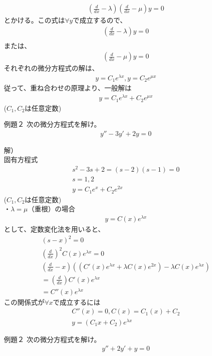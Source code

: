 \documentclass{jsarticle}
\begin{document}
\begin{eqnarray}
\left(\frac{d}{dx}-\lambda \right)\left(\frac{d}{dx}-\mu \right)y=0
\end{eqnarray}
とかける。この式は$\forall y$で成立するので、
\begin{eqnarray}
\left(\frac{d}{dx}-\lambda\right)y=0\\
\end{eqnarray}
または、
\begin{eqnarray}
\left(\frac{d}{dx}-\mu\right)y=0
\end{eqnarray}
それぞれの微分方程式の解は、
\begin{eqnarray}
y=C_1e^{\lambda x},y=C_2e^{\mu x}
\end{eqnarray}
従って、重ね合わせの原理より、一般解は
\begin{eqnarray}
y=C_1e^{\lambda x}+C_2e^{\mu x}
\end{eqnarray}
($C_1,C_2$は任意定数)
\begin{itembox}[l]{例題２}
次の微分方程式を解け。
\begin{eqnarray}
y''-3y'+2y=0
\end{eqnarray}
\end{itembox}
解）\\
固有方程式
\begin{eqnarray}
s^2-3s+2=(s-2)(s-1)=0\\
s=1,2\\
y=C_1e^x+C_2e^{2x}
\end{eqnarray}
($C_1,C_2$は任意定数)\\
・$\lambda = \mu$（重根）の場合\\
\begin{eqnarray}
y=C(x)e^{\lambda x}
\end{eqnarray}
として、定数変化法を用いると、
\begin{eqnarray}
(s-x)^2=0\\
\left(\frac{d}{dx}\right)^2C(x)e^{\lambda x}=0\\
\left(\frac{d}{dx}-x\right)\left(\left(C'(x)e^{\lambda x}+\lambda C(x)e^{2x}\right)-\lambda C(x)e^{\lambda x}\right)\\
=\left(\frac{d}{dx}\right)C'(x)e^{\lambda x}\\
=C''(x)e^{\lambda x}
\end{eqnarray}
この関係式が$\forall x$で成立するには
\begin{eqnarray}
C''(x)=0,C(x)=C_1(x)+C_2\\
y=(C_1x+C_2)e^{\lambda x}
\end{eqnarray}
\begin{itembox}[l]{例題２}
次の微分方程式を解け。
\begin{eqnarray}
y''+2y'+y=0
\end{eqnarray}
\end{itembox}
\end{document}
